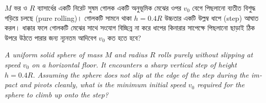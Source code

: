 \documentclass[12pt, a4paper]{article}
\begin{document}
\begin{tcolorbox}[questionbox={প্রশ্ন (Question) 34}]
    \noindent
    $M$ ভর ও $R$ ব্যাসার্ধের একটি নিরেট সুষম গোলক একটি অনুভূমিক মেঝের ওপর $v_0$ বেগে পিছলানো ব্যতীত বিশুদ্ধ গড়িয়ে চলছে (pure rolling)। গোলকটি সামনে থাকা $h = 0.4R$ উচ্চতার একটি উল্লম্ব ধাপে (step) আঘাত করল। ধাক্কার ফলে গোলকটি মেঝের সাথে সংযোগ বিচ্ছিন্ন না করে ধাপের কিনারার সাপেক্ষে পিছলানো ছাড়াই ঠিক উপরে উঠতে পারার জন্য ন্যূনতম আদিবেগ $v_0$ কত হতে হবে?
    
    \vspace{0.8em}
    \begin{english}
    \noindent\textit{\color{darkgray}
    A uniform solid sphere of mass $M$ and radius $R$ rolls purely without slipping at speed $v_0$ on a horizontal floor. It encounters a sharp vertical step of height $h = 0.4R$. Assuming the sphere does not slip at the edge of the step during the impact and pivots cleanly, what is the minimum initial speed $v_0$ required for the sphere to climb up onto the step?
    }
    \end{english}
\end{tcolorbox}

\vspace{1em}
\begin{center}
\end{center}
\vspace{1em}
\end{document}
